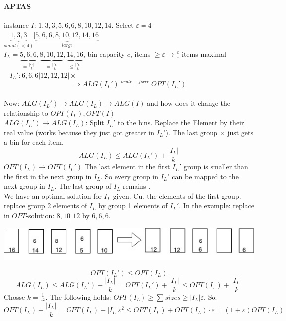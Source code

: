 \paragraph{APTAS} instance $I$: $1,3,3, 5, 6, 6, 8, 10, 12, 14$. Select $\varepsilon = 4$ \\ \newline 
$\underbrace{1,3,3}_{small (<4)} | \underbrace{5, 6, 6, 8, 10, 12, 14,16}_{large}$ \\ \newline 
$I_L = \underbrace{5,6,6}_{=\frac{|I_L|}{k}},\underbrace{8,10,12}_{=\frac{|I_L|}{k}},\underbrace{14,16}_{\leq\frac{|I_L|}{k}}$, bin capacity $c$, items $\geq \varepsilon \rightarrow  \frac{c}{\varepsilon}$ items maximal \\ \newline  
$I_L':6,6,6 | 12,12,12 | \times$ $$\Rightarrow ALG(I_L') \stackrel{brute-force}{=}OPT(I_L')$$ \\
Now: $ALG(I_L') \rightarrow ALG(I_L) \rightarrow ALG(I)$ and how does it change the relationship to $OPT(I_L), OPT(I)$ \\ \newline 
$ALG(I_L') \rightarrow ALG(I_L)$: Split $I_L'$ to the bins. Replace the Element by their real value (works because they just got greater in $I_L'$). The last group $\times$ just gets a bin for each item. $$ALG(I_L) \leq ALG(I_L') + \frac{|I_L|}{k}$$
$OPT(I_L) \rightarrow OPT(I_L')$ The last element in the first $I_L'$ group is smaller than the first in the next group in $I_L$. So every group in $I_L'$ can be mapped to the next group in $I_L$. The last group of $I_L$ remains . \\
We have an optimal solution for $I_L$ given. Cut the elements of the first group. replace group 2 elements of $I_L$  by group 1 elements of $I_L'$. In the example: replace in $OPT$-solution: $8,10,12$ by $6,6,6$. \\
\begin{center}
\includegraphics[scale=0.5]{img/bin-pack} 
\end{center}
$$OPT(I_L') \leq OPT(I_L)$$
$$ALG(I_L) \leq ALG(I_L') + \frac{|I_L|}{k} = OPT(I_L') + \frac{|I_L|}{k} \leq OPT(I_L) + \frac{|I_L|}{k}$$
Chosse $k = \frac{1}{\varepsilon^2}$. The following holds: $OPT(I_L) \geq \sum sizes \geq |I_L|\varepsilon$. So:
$$ OPT(I_L) + \frac{|I_L|}{k} = OPT(I_L) + |I_L|\varepsilon^2 \leq OPT(I_L) + OPT(I_L) \cdot \varepsilon  = (1+ \varepsilon) OPT(I_L)$$
